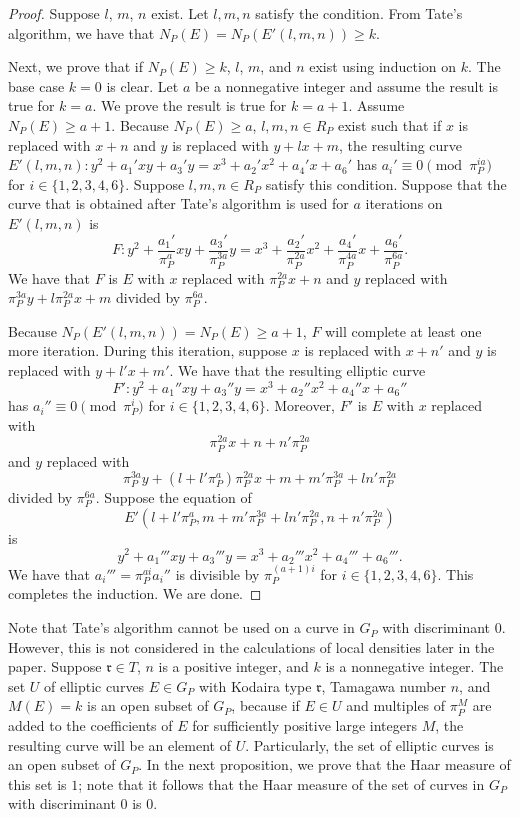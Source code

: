 \documentclass[12pt,letterpaper]{amsart}
\theoremstyle{definition}
\begin{document}
\begin{proof}
Suppose $l$, $m$, $n$ exist. Let $l,m,n$ satisfy the condition. From Tate's algorithm, we have that $N_P(E)=N_P(E'(l,m,n))\geq k$.

Next, we prove that if $N_P(E)\geq k$, $l$, $m$, and $n$ exist using induction on $k$. The base case $k=0$ is clear. Let $a$ be a nonnegative integer and assume the result is true for $k=a$. We prove the result is true for $k=a+1$. Assume $N_P(E)\geq a+1$. Because $N_P(E)\geq a$, $l,m,n\in R_P$ exist such that if $x$ is replaced with $x+n$ and $y$ is replaced with $y+lx+m$, the resulting curve $E'(l,m,n): y^2+a_1'xy+a_3'y=x^3+a_2'x^2+a_4'x+a_6'$ has $a_i'\equiv 0\pmod{\pi_P^{ia}}$ for $i\in\{1,2,3,4,6\}$. Suppose $l,m,n\in R_P$ satisfy this condition. Suppose that the curve that is obtained after Tate's algorithm is used for $a$ iterations on $E'(l,m,n)$ is
\[
F: y^2+\frac{a_1'}{\pi_P^a}xy+\frac{a_3'}{\pi_P^{3a}}y=x^3+\frac{a_2'}{\pi_P^{2a}}x^2+\frac{a_4'}{\pi_P^{4a}}x+\frac{a_6'}{\pi_P^{6a}}.
\]
We have that $F$ is $E$ with $x$ replaced with $\pi_P^{2a}x+n$ and $y$ replaced with $\pi_P^{3a}y+l\pi_P^{2a}x+m$ divided by $\pi_P^{6a}$.

Because $N_P(E'(l,m,n))=N_P(E)\geq a+1$, $F$ will complete at least one more iteration. During this iteration, suppose $x$ is replaced with $x+n'$ and $y$ is replaced with $y+l'x+m'$. We have that
the resulting elliptic curve
\[
F': y^2+a_1''xy+a_3''y=x^3+a_2''x^2+a_4''x+a_6''
\]
has $a_i''\equiv 0\pmod{\pi_P^i}$ for $i\in\{1,2,3,4,6\}$. Moreover, $F'$ is $E$ with $x$ replaced with 
\[
\pi_P^{2a}x+n+n'\pi_P^{2a}
\]
and $y$ replaced with 
\[
\pi_P^{3a}y+(l+l'\pi_P^a)\pi_P^{2a}x+m+m'\pi_P^{3a}+ln'\pi_P^{2a}\]
divided by $\pi_P^{6a}$. Suppose the equation of
\[
E'(l+l'\pi_P^a, m+m'\pi_P^{3a}+ln'\pi_P^{2a}, n+n'\pi_P^{2a})
\]
is
\[
y^2+a_1'''xy+a_3'''y=x^3+a_2'''x^2+a_4'''+a_6'''.
\]
We have that $a_i'''=\pi_P^{ai}a_i''$ is divisible by $\pi_P^{(a+1)i}$ for $i\in\{1,2,3,4,6\}$. This completes the induction. We are done.
\end{proof}

Note that Tate's algorithm cannot be used on a curve in $G_P$ with discriminant $0$. However, this is not considered in the calculations of local densities later in the paper. Suppose $\mathfrak{r}\in T$, $n$ is a positive integer, and $k$ is a nonnegative integer. The set $U$ of elliptic curves $E\in G_P$ with Kodaira type $\mathfrak{r}$, Tamagawa number $n$, and $M(E)=k$ is an open subset of $G_P$, because if $E\in U$ and multiples of $\pi_P^M$ are added to the coefficients of $E$ for sufficiently positive large integers $M$, the resulting curve will be an element of $U$. Particularly, the set of elliptic curves is an open subset of $G_P$. In the next proposition, we prove that the Haar measure of this set is $1$; note that it follows that the Haar measure of the set of curves in $G_P$ with discriminant $0$ is $0$.
\end{document}
